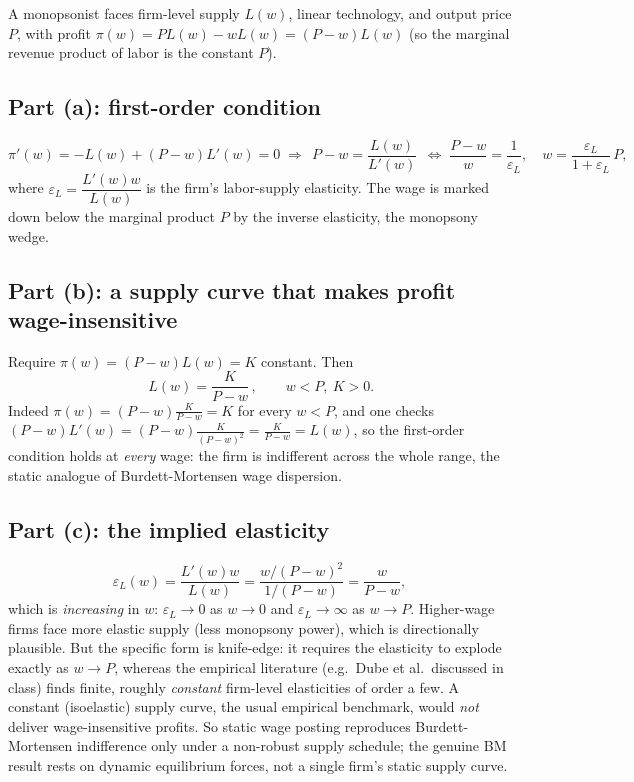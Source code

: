 \documentclass[11pt]{article}
\begin{document}
A monopsonist faces firm-level supply $L(w)$, linear technology, and output
price $P$, with profit $\pi(w)=PL(w)-wL(w)=(P-w)L(w)$ (so the marginal revenue
product of labor is the constant $P$).

\subsection*{Part (a): first-order condition}

\[
\pi'(w)=-L(w)+(P-w)L'(w)=0
\;\Longrightarrow\;
\boxed{\,P-w=\frac{L(w)}{L'(w)}\,}
\;\Longleftrightarrow\;
\frac{P-w}{w}=\frac{1}{\varepsilon_L},\quad
w=\frac{\varepsilon_L}{1+\varepsilon_L}\,P,
\]
where $\varepsilon_L=\dfrac{L'(w)w}{L(w)}$ is the firm's labor-supply
elasticity. The wage is marked down below the marginal product $P$ by the
inverse elasticity, the monopsony wedge.

\subsection*{Part (b): a supply curve that makes profit wage-insensitive}

Require $\pi(w)=(P-w)L(w)=K$ constant. Then
\begin{equation}
\boxed{\,L(w)=\frac{K}{P-w}\,,\qquad w<P,\ K>0.}
\end{equation}
Indeed $\pi(w)=(P-w)\frac{K}{P-w}=K$ for every $w<P$, and one checks
$(P-w)L'(w)=(P-w)\frac{K}{(P-w)^2}=\frac{K}{P-w}=L(w)$, so the first-order
condition holds at \emph{every} wage: the firm is indifferent across the whole
range, the static analogue of Burdett-Mortensen wage dispersion.

\subsection*{Part (c): the implied elasticity}

\[
\varepsilon_L(w)=\frac{L'(w)w}{L(w)}
 =\frac{w/(P-w)^2}{1/(P-w)}=\boxed{\frac{w}{P-w}},
\]
which is \emph{increasing} in $w$: $\varepsilon_L\rightarrow0$ as $w\rightarrow0$ and
$\varepsilon_L\rightarrow\infty$ as $w\rightarrow P$. Higher-wage firms face more elastic supply
(less monopsony power), which is directionally plausible. But the specific form is
knife-edge: it requires the elasticity to explode exactly as $w\rightarrow P$, whereas
the empirical literature (e.g.\ Dube et al.\ discussed in class) finds finite,
roughly \emph{constant} firm-level elasticities of order a few. A constant
(isoelastic) supply curve, the usual empirical benchmark, would \emph{not}
deliver wage-insensitive profits. So static wage posting reproduces
Burdett-Mortensen indifference only under a non-robust supply schedule; the
genuine BM result rests on dynamic equilibrium forces, not a single firm's
static supply curve.
\end{document}

